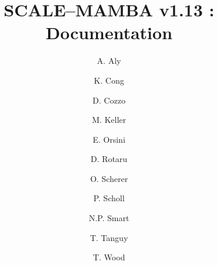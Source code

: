 \documentclass{article}
\begin{document}
\newcommand{\mainsection}[1]{\newpage \section{#1}}
\newcommand{\msubsection}[1]{\newpage \subsection{#1}}
\newcommand{\msubsubsection}[1]{\subsubsection{#1}}

\title{SCALE--MAMBA v1.13 : Documentation}
\author{
A. Aly
\and K. Cong
\and D. Cozzo
\and M. Keller 
\and E. Orsini
\and D. Rotaru 
\and O. Scherer
\and P. Scholl 
\and N.P. Smart
\and T. Tanguy
\and T. Wood}

\maketitle

\tableofcontents































\end{document}
